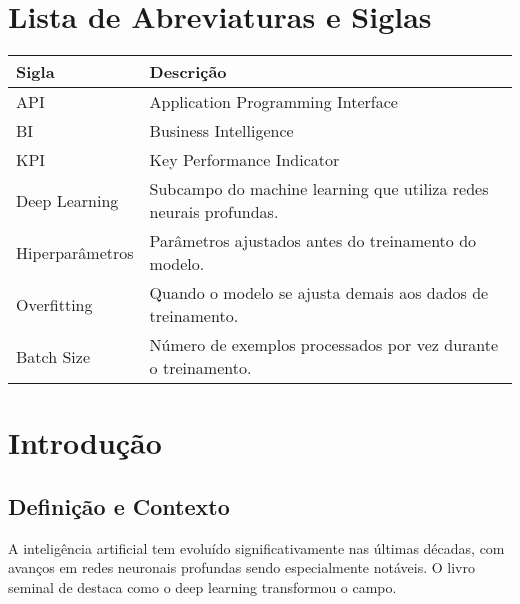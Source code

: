 


	
	
	
	
	
	
	
	
	
	
	
	
	
	
	
	
	\tableofcontents
	\newpage
	\listoffigures
	\newpage
	\listoftables
	\newpage
	
	
	\chapter*{Lista de Abreviaturas e Siglas}
	\begin{longtable}{p{3cm}p{10cm}}
		\textbf{Sigla} & \textbf{Descrição} \\
		\hline
		API & Application Programming Interface \\
		BI & Business Intelligence \\
		KPI & Key Performance Indicator \\
		Deep Learning & Subcampo do machine learning que utiliza redes neurais profundas. \\
		Hiperparâmetros & Parâmetros ajustados antes do treinamento do modelo. \\
		Overfitting & Quando o modelo se ajusta demais aos dados de treinamento. \\
		Batch Size & Número de exemplos processados por vez durante o treinamento. \\
	\end{longtable}
	
	\newpage
	
	\pagestyle{conteudo}
	
	\chapter{Introdução}
	\section{Definição e Contexto}
	A inteligência artificial tem evoluído significativamente nas últimas décadas, com avanços em redes neuronais profundas sendo especialmente notáveis. O livro seminal de \citet{goodfellow2016} destaca como o deep learning transformou o campo.
	
